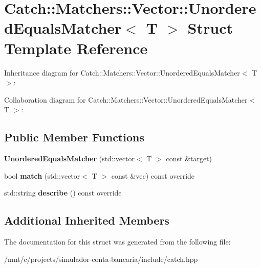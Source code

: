 \hypertarget{structCatch_1_1Matchers_1_1Vector_1_1UnorderedEqualsMatcher}{}\section{Catch\+:\+:Matchers\+:\+:Vector\+:\+:Unordered\+Equals\+Matcher$<$ T $>$ Struct Template Reference}
\label{structCatch_1_1Matchers_1_1Vector_1_1UnorderedEqualsMatcher}


Inheritance diagram for Catch\+:\+:Matchers\+:\+:Vector\+:\+:Unordered\+Equals\+Matcher$<$ T $>$\+:


Collaboration diagram for Catch\+:\+:Matchers\+:\+:Vector\+:\+:Unordered\+Equals\+Matcher$<$ T $>$\+:
\subsection*{Public Member Functions}
\begin{DoxyCompactItemize}
\item 
\mbox{\label{structCatch_1_1Matchers_1_1Vector_1_1UnorderedEqualsMatcher_a525905639b2b15b52ddb0bf14bfa19da}} 
{\bfseries Unordered\+Equals\+Matcher} (std\+::vector$<$ T $>$ const \&target)
\item 
\mbox{\label{structCatch_1_1Matchers_1_1Vector_1_1UnorderedEqualsMatcher_a3ccdd9dd2cd8bdbb8bb121acbb9cb358}} 
bool {\bfseries match} (std\+::vector$<$ T $>$ const \&vec) const override
\item 
\mbox{\label{structCatch_1_1Matchers_1_1Vector_1_1UnorderedEqualsMatcher_a7202d811200317abc58c844f663823df}} 
std\+::string {\bfseries describe} () const override
\end{DoxyCompactItemize}
\subsection*{Additional Inherited Members}


The documentation for this struct was generated from the following file\+:\begin{DoxyCompactItemize}
\item 
/mnt/c/projects/simulador-\/conta-\/bancaria/include/catch.\+hpp\end{DoxyCompactItemize}
